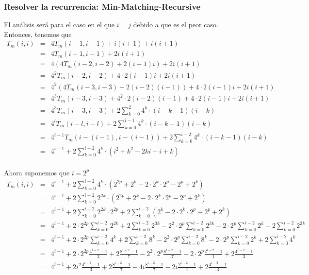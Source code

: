 \documentclass[12pt]{article}
\begin{document}
\subsubsection*{Resolver la recurrencia: Min-Matching-Recursive}
\noindent El análisis será para el caso en el que $i=j$ debido a que es el peor caso. Entonces, tenemos que
\begin{eqnarray*}
T_m(i,i) &=& 4T_m(i-1,i-1) + i(i+1) + i(i+1) \\
&=& 4T_m(i-1,i-1) + 2i(i+1) \\
&=& 4(4T_m(i-2,i-2) + 2(i-1)i) + 2i(i+1) \\
&=& 4^2T_m(i-2,i-2) + 4\cdot 2(i-1)i + 2i(i+1) \\
&=& 4^2(4T_m(i-3,i-3) + 2(i-2)(i-1)) + 4\cdot 2(i-1)i + 2i(i+1) \\
&=& 4^3T_m(i-3,i-3) + 4^2\cdot 2(i-2)(i-1) + 4\cdot 2(i-1)i + 2i(i+1) \\
&=& 4^3T_m(i-3,i-3) + 2\sum_{k=0}^{2} 4^k\cdot (i-k-1)(i-k) \\
&=& 4^lT_m(i-l,i-l) + 2\sum_{k=0}^{l-1} 4^k\cdot (i-k-1)(i-k) \\
&=& 4^{i-1}T_m(i-(i-1),i-(i-1)) + 2\sum_{k=0}^{i-2} 4^k\cdot (i-k-1)(i-k) \\
&=& 4^{i-1} + 2\sum_{k=0}^{i-2} 4^k\cdot (i^2+k^2-2ki-i+k) \\
\end{eqnarray*}

\noindent Ahora suponemos que $i=2^p$
\begin{eqnarray*}
T_m(i,i) &=& 4^{i-1} + 2\sum_{k=0}^{i-2} 4^k\cdot (2^{2p}+2^{k}-2\cdot 2^{k}\cdot 2^p-2^p+2^k) \\
&=& 4^{i-1} + 2\sum_{k=0}^{i-2} 2^{2k}\cdot (2^{2p}+2^{k}-2\cdot 2^{k}\cdot 2^p-2^p+2^k) \\
&=& 4^{i-1} + 2\sum_{k=0}^{i-2} 2^{2k}\cdot 2^{2p} + 2\sum_{k=0}^{i-2}(2^{k}-2\cdot 2^{k}\cdot 2^p-2^p+2^k) \\
&=& 4^{i-1} + 2\cdot 2^{2p}\sum_{k=0}^{i-2} 2^{2k} + 2\sum_{k=0}^{i-2}2^{3k} - 2^2\cdot 2^p\sum_{k=0}^{i-2}2^{3k} - 2\cdot 2^p\sum_{k=0}^{i-2}2^k + 2\sum_{k=0}^{i-2}2^{2k} \\
&=& 4^{i-1} + 2\cdot 2^{2p}\sum_{k=0}^{i-2} 4^{k} + 2\sum_{k=0}^{i-2}8^{k} - 2^2\cdot 2^p\sum_{k=0}^{i-2}8^{k} - 2\cdot 2^p\sum_{k=0}^{i-2}2^k + 2\sum_{k=0}^{i-2}4^{k} \\
&=& 4^{i-1} + 2\cdot 2^{2p}\frac{4^{i-2}-1}{3} + 2\frac{8^{i-2}-1}{7} - 2^2\cdot 2^p\frac{8^{i-2}-1}{7} - 2\cdot 2^p\frac{2^{i-2}-1}{1} + 2\frac{4^{i-2}-1}{3} \\
&=& 4^{i-1} + 2 i^{2}\frac{4^{i-2}-1}{3} + 2\frac{8^{i-2}-1}{7} - 4 i\frac{8^{i-2}-1}{7} - 2i\frac{2^{i-2}-1}{1} + 2\frac{4^{i-2}-1}{3}
\end{eqnarray*}
\end{document}
